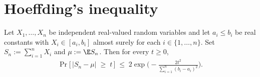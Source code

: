 \section{Hoeffding's inequality}
\label{sec:main-theorem}

\begin{theorem}\label{thm:hoeffding}
Let $X_1, \ldots, X_n$ be independent real-valued random variables and let
$a_i \le b_i$ be real constants with $X_i \in [a_i, b_i]$ almost surely for each
$i \in \{1, \ldots, n\}$. Set $S_n := \sum_{i=1}^n X_i$ and $\mu := \E S_n$. Then for
every $t \ge 0$,
\begin{align}\label{eq:hoeffding-two-sided}
\Pr\bigl[\,\lvert S_n - \mu \rvert \;\ge\; t\,\bigr]
\;\le\; 2 \exp\!\Biggl( - \frac{2 t^2}{\sum_{i=1}^n (b_i - a_i)^2} \Biggr).
\end{align}
\end{theorem}


